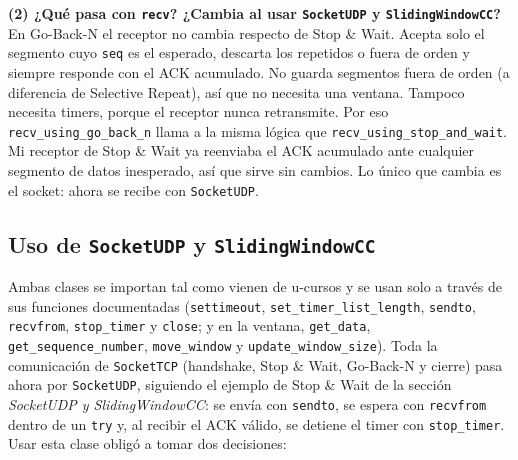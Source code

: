 \documentclass[11pt,letterpaper]{article}
\begin{document}
\textbf{(2) ¿Qué pasa con \texttt{recv}? ¿Cambia al usar \texttt{SocketUDP} y
\texttt{SlidingWindowCC}?} En Go-Back-N el receptor no cambia respecto de Stop \& Wait.
Acepta solo el segmento cuyo \texttt{seq} es el esperado, descarta los repetidos o fuera de
orden y siempre responde con el ACK acumulado. No guarda segmentos fuera de orden (a
diferencia de Selective Repeat), así que no necesita una ventana. Tampoco necesita
timers, porque el receptor nunca retransmite. Por eso \texttt{recv\_using\_go\_back\_n}
llama a la misma lógica que \texttt{recv\_using\_stop\_and\_wait}. Mi receptor de Stop \&
Wait ya reenviaba el ACK acumulado ante cualquier segmento de datos inesperado, así que
sirve sin cambios. Lo único que cambia es el socket: ahora se recibe con
\texttt{SocketUDP}.

\subsection{Uso de \texttt{SocketUDP} y \texttt{SlidingWindowCC}}

Ambas clases se importan tal como vienen de u-cursos y se usan solo a través de sus
funciones documentadas (\texttt{settimeout}, \texttt{set\_timer\_list\_length},
\texttt{sendto}, \texttt{recvfrom}, \texttt{stop\_timer} y \texttt{close}; y en la
ventana, \texttt{get\_data}, \texttt{get\_sequence\_number}, \texttt{move\_window} y
\texttt{update\_window\_size}). Toda la comunicación de \texttt{SocketTCP} (handshake,
Stop \& Wait, Go-Back-N y cierre) pasa ahora por \texttt{SocketUDP}, siguiendo el ejemplo
de Stop \& Wait de la sección \emph{SocketUDP y SlidingWindowCC}: se envía con
\texttt{sendto}, se espera con \texttt{recvfrom} dentro de un \texttt{try} y, al recibir
el ACK válido, se detiene el timer con \texttt{stop\_timer}. Usar esta clase obligó a
tomar dos decisiones:
\end{document}
